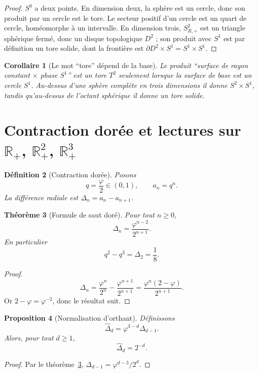 \documentclass[11pt,a4paper]{article}
\newtheorem{theorem}{Théorème}[section]
\newtheorem{proposition}[theorem]{Proposition}
\newtheorem{corollary}[theorem]{Corollaire}
\newtheorem{definition}[theorem]{Définition}
\newcommand{\R}{\mathbb R}
\newcommand{\Rp}{\mathbb R_{+}}
\newcommand{\ph}{\varphi}
\begin{document}
\begin{proof}
$S^0$ a deux points. En dimension deux, la sphère est un cercle, donc son produit par un cercle est le tore. Le secteur positif d'un cercle est un quart de cercle, homéomorphe à un intervalle. En dimension trois, $S^2_{R,+}$ est un triangle sphérique fermé, donc un disque topologique $D^2$ ; son produit avec $S^1$ est par définition un tore solide, dont la frontière est $\partial D^2\times S^1=S^1\times S^1$.
\end{proof}

\begin{corollary}[Le mot ``tore'' dépend de la base]
Le produit ``surface de rayon constant $\times$ phase $S^1$'' est un tore $T^2$ seulement lorsque la surface de base est un cercle $S^1$. Au-dessus d'une sphère complète en trois dimensions il donne $S^2\times S^1$, tandis qu'au-dessus de l'octant sphérique il donne un tore solide.
\end{corollary}

\section{Contraction dorée et lectures sur $\R_+$, $\Rp^2$, $\Rp^3$}

\begin{definition}[Contraction dorée]
Posons
\[
 q=\frac{\ph}{2}\in(0,1),\qquad a_n=q^n.
\]
La différence radiale est $\Delta_n=a_n-a_{n+1}$.
\end{definition}

\begin{theorem}[Formule de saut doré]\label{thm:goldjump}
Pour tout $n\ge0$,
\[
 \Delta_n=\frac{\ph^{n-2}}{2^{n+1}}.
\]
En particulier
\[
 q^2-q^3=\Delta_2=\frac18.
\]
\end{theorem}

\begin{proof}
\[
 \Delta_n=\frac{\ph^n}{2^n}-\frac{\ph^{n+1}}{2^{n+1}}
 =\frac{\ph^n(2-\ph)}{2^{n+1}}.
\]
Or $2-\ph=\ph^{-2}$, donc le résultat suit.
\end{proof}

\begin{proposition}[Normalisation d'orthant]
Définissons
\[
 \widehat\Delta_d=\ph^{3-d}\Delta_{d-1}.
\]
Alors, pour tout $d\ge1$,
\[
 \widehat\Delta_d=2^{-d}.
\]
\end{proposition}

\begin{proof}
Par le théorème~\ref{thm:goldjump}, $\Delta_{d-1}=\ph^{d-3}/2^d$.
\end{proof}
\end{document}
